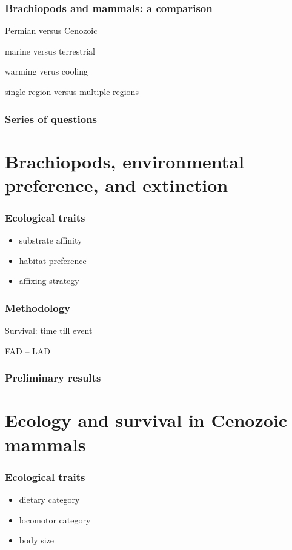 \documentclass{beamer}
\begin{document}
\begin{frame}
  \frametitle{Brachiopods and mammals: a comparison}

  Permian versus Cenozoic

  marine versus terrestrial

  warming verus cooling

  single region versus multiple regions 
\end{frame}

\begin{frame}
  \frametitle{Series of questions}
\end{frame}


\section{Brachiopods, environmental preference, and extinction}

\begin{frame}
  \frametitle{Ecological traits}
  \begin{itemize}
    \item substrate affinity
    \item habitat preference
    \item affixing strategy
  \end{itemize}
\end{frame}

\begin{frame}
  \frametitle{Methodology}
   
  Survival: time till event

  FAD -- LAD
\end{frame}

\begin{frame}
  \frametitle{Preliminary results}
\end{frame}


\section{Ecology and survival in Cenozoic mammals}

\begin{frame}
  \frametitle{Ecological traits}
  \begin{itemize}
    \item dietary category
    \item locomotor category
    \item body size
  \end{itemize}
\end{frame}
\end{document}
